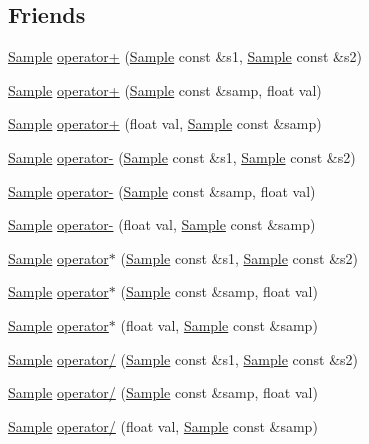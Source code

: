 \subsection*{Friends}
\begin{DoxyCompactItemize}
\item 
\hyperlink{classDSG_1_1Sample}{Sample} \hyperlink{classDSG_1_1Sample_a2fd9547bca678d483b7678ff2d19c7bf}{operator+} (\hyperlink{classDSG_1_1Sample}{Sample} const \&s1, \hyperlink{classDSG_1_1Sample}{Sample} const \&s2)
\item 
\hyperlink{classDSG_1_1Sample}{Sample} \hyperlink{classDSG_1_1Sample_a001ec49a9676fe37d9dfbb6f0b27127d}{operator+} (\hyperlink{classDSG_1_1Sample}{Sample} const \&samp, float val)
\item 
\hyperlink{classDSG_1_1Sample}{Sample} \hyperlink{classDSG_1_1Sample_a9a5ae50b9096d1c778d6a676b562e11a}{operator+} (float val, \hyperlink{classDSG_1_1Sample}{Sample} const \&samp)
\item 
\hyperlink{classDSG_1_1Sample}{Sample} \hyperlink{classDSG_1_1Sample_a4539e34cec889979677229c5ddf6eaf1}{operator-\/} (\hyperlink{classDSG_1_1Sample}{Sample} const \&s1, \hyperlink{classDSG_1_1Sample}{Sample} const \&s2)
\item 
\hyperlink{classDSG_1_1Sample}{Sample} \hyperlink{classDSG_1_1Sample_a30c04ca57e9f947cdd68041231676acc}{operator-\/} (\hyperlink{classDSG_1_1Sample}{Sample} const \&samp, float val)
\item 
\hyperlink{classDSG_1_1Sample}{Sample} \hyperlink{classDSG_1_1Sample_a27b97bc41eae03efe5f4157bdc3e42b2}{operator-\/} (float val, \hyperlink{classDSG_1_1Sample}{Sample} const \&samp)
\item 
\hyperlink{classDSG_1_1Sample}{Sample} \hyperlink{classDSG_1_1Sample_ae6e21a0672b773c8ae0537410c48a385}{operator$\ast$} (\hyperlink{classDSG_1_1Sample}{Sample} const \&s1, \hyperlink{classDSG_1_1Sample}{Sample} const \&s2)
\item 
\hyperlink{classDSG_1_1Sample}{Sample} \hyperlink{classDSG_1_1Sample_a6c56eccda9469f7283e67c6e89b05239}{operator$\ast$} (\hyperlink{classDSG_1_1Sample}{Sample} const \&samp, float val)
\item 
\hyperlink{classDSG_1_1Sample}{Sample} \hyperlink{classDSG_1_1Sample_afacc0c2623435bca02ee4049ed2db550}{operator$\ast$} (float val, \hyperlink{classDSG_1_1Sample}{Sample} const \&samp)
\item 
\hyperlink{classDSG_1_1Sample}{Sample} \hyperlink{classDSG_1_1Sample_a26dc248966f0cb3c5d1c52f7aa6643d4}{operator/} (\hyperlink{classDSG_1_1Sample}{Sample} const \&s1, \hyperlink{classDSG_1_1Sample}{Sample} const \&s2)
\item 
\hyperlink{classDSG_1_1Sample}{Sample} \hyperlink{classDSG_1_1Sample_a135d15a9237414aabce1df8f3a5ae77f}{operator/} (\hyperlink{classDSG_1_1Sample}{Sample} const \&samp, float val)
\item 
\hyperlink{classDSG_1_1Sample}{Sample} \hyperlink{classDSG_1_1Sample_a6178925f7213e13df7f4106cc0e22330}{operator/} (float val, \hyperlink{classDSG_1_1Sample}{Sample} const \&samp)
\end{DoxyCompactItemize}


